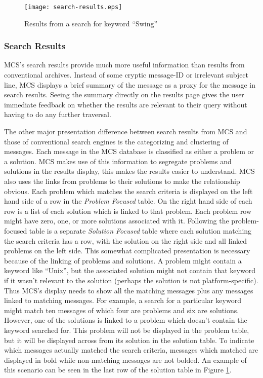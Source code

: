 \begin{figure}[htbp]
  \centering
  \texttt{[image: search-results.eps]}
  \caption{Results from a search for keyword ``Swing''}
  \label{fig:search-results}
\end{figure}

\subsubsection{Search Results}
MCS's search results provide much more useful information than results from
conventional archives. Instead of some cryptic message-ID or irrelevant subject
line, MCS displays a brief summary of the message as a proxy for the message in
search results. Seeing the summary directly on the results page gives the user
immediate feedback on whether the results are relevant to their query without
having to do any further traversal.

The other major presentation difference between search results from MCS and
those of conventional search engines is the categorizing and clustering of
messages. Each message in the MCS database is classified as either a problem
or a solution. MCS makes use of this information to segregate problems and
solutions in the results display, this makes the results easier to understand.
MCS also uses the links from problems to their solutions to make the
relationship obvious. Each problem which matches the search criteria is
displayed on the left hand side of a row in the {\it Problem Focused} table. On
the right hand side of each row is a list of each solution which is linked to
that problem. Each problem row might have zero, one, or more solutions
associated with it. Following the problem-focused table is a separate {\it
  Solution Focused} table where each solution matching the search criteria has
a row, with the solution on the right side and all linked problems on the left
side. This somewhat complicated presentation is necessary because of the
linking of problems and solutions. A problem might contain a keyword like
``Unix'', but the associated solution might not contain that keyword if it
wasn't relevant to the solution (perhaps the solution is not
platform-specific). Thus MCS's display needs to show all the matching messages
plus any messages linked to matching messages. For example, a search for a
particular keyword might match ten messages of which four are problems and six
are solutions. However, one of the solutions is linked to a problem which
doesn't contain the keyword searched for. This problem will not be displayed in
the problem table, but it will be displayed across from its solution in the
solution table. To indicate which messages actually matched the search
criteria, messages which matched are displayed in bold while non-matching
messages are not bolded. An example of this scenario can be seen in the last
row of the solution table in Figure \ref{fig:search-results}.

